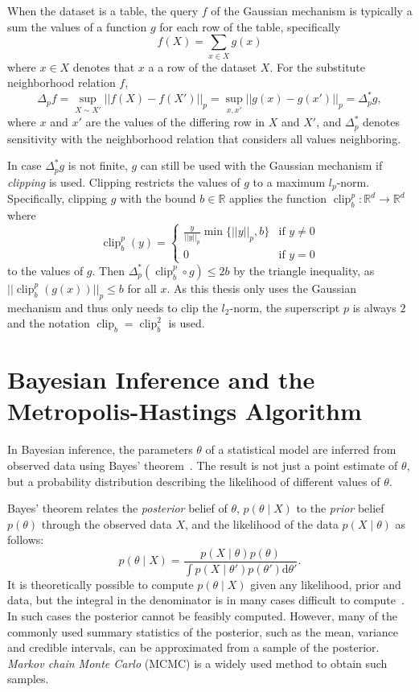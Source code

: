 \documentclass[english,twoside,openright]{HYgraduMLDS}
\newcommand{\R}{\mathbb{R}}
\newcommand{\dx}{\mathrm{d}}
\DeclareMathOperator{\clip}{clip}
\begin{document}
When the dataset is a table, the query \(f\) of the Gaussian mechanism is
typically a sum the values of a function \(g\) for each row of the table,
specifically
\[
  f(X) = \sum_{x\in X} g(x)
\]
where \(x\in X\) denotes that \(x\) a a row of the dataset \(X\).
For the substitute neighborhood relation \(f\),
\[
  \Delta_{p}f = \sup_{X\sim X'}||f(X) - f(X')||_{p}
  = \sup_{x, x'}||g(x) - g(x')||_{p}
  = \Delta^{*}_{p}g,
\]
where \(x\) and \(x'\) are the values of the differing row in \(X\) and \(X'\),
and \(\Delta^{*}_{p}\) denotes sensitivity with the neighborhood relation that
considers all values neighboring.

In case \(\Delta^{*}_{p}g\) is not finite, \(g\) can still be used with
the Gaussian mechanism if \emph{clipping} is used. Clipping restricts the
values of \(g\) to a maximum \(l_{p}\)-norm. Specifically, clipping
\(g\) with the bound \(b\in \R\) applies
the function \(\clip_{b}^{p}\colon \R^{d}\to \R^{d}\) where
\[
  \clip_{b}^{p}(y) =
  \begin{cases}
    \frac{y}{||y||_{p}}\min\{||y||_{p}, b\} & \text{if } y \neq 0\\
    0 & \text{if } y = 0
  \end{cases}
\]
to the values of \(g\). Then \(\Delta^{*}_{p}(\clip_{b}^{p} \circ g) \leq 2b\) by the
triangle inequality, as \(||\clip_{b}^{p}(g(x))||_{p} \leq b\) for
all \(x\). As this thesis only uses the Gaussian mechanism and
thus only needs to clip the \(l_{2}\)-norm, the superscript \(p\) is always
\(2\) and the notation \(\clip_{b} = \clip_{b}^{2}\) is used.

\section{Bayesian Inference and the Metropolis-Hastings Algorithm}\label{MCMC_background}

In Bayesian inference, the parameters \(\theta\) of a statistical model are
inferred from 
observed data using Bayes' theorem~\cite{BDA}. The result is not just a point estimate 
of \(\theta\), but a probability distribution describing the likelihood
of different values of \(\theta\).

Bayes' theorem relates the \emph{posterior} belief of \(\theta\),
\(p(\theta \mid X)\) to the \emph{prior} belief \(p(\theta)\) through the 
observed data \(X\), and the likelihood of the data \(p(X\mid \theta)\) as follows:
\[
    p(\theta \mid X) = \frac{p(X \mid \theta)p(\theta)}
    {\int p(X\mid \theta')p(\theta')\dx\theta'}.
\]
It is theoretically possible to compute \(p(\theta \mid X)\) given any 
likelihood, prior and data, but the integral in the denominator is in many 
cases difficult to compute~\cite{BDA}. In such cases the posterior cannot be feasibly 
computed. However, many of the commonly used summary statistics of the posterior, 
such as the mean, variance and credible intervals, can be approximated from 
a sample of the posterior. \emph{Markov chain Monte Carlo}
(MCMC) is a widely used method to obtain such samples.
\end{document}
